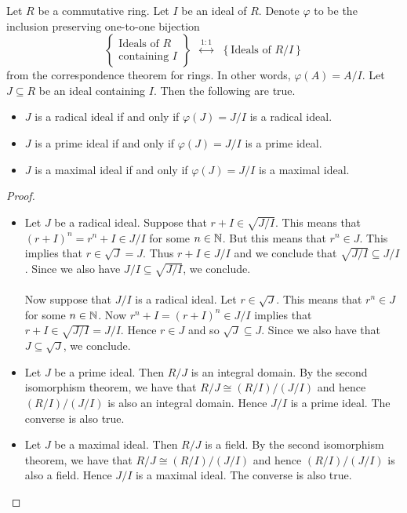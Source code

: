 \documentclass[a4paper]{article}
\begin{document}
\begin{thm}{}{} Let $R$ be a commutative ring. Let $I$ be an ideal of $R$. Denote $\varphi$ to be the inclusion preserving one-to-one bijection $$\left\{\substack{\text{Ideals of }R\\\text{containing }I}\right\}\;\;\overset{1:1}{\longleftrightarrow}\;\;\left\{\text{Ideals of }R/I\right\}$$ from the correspondence theorem for rings. In other words, $\varphi(A)=A/I$. Let $J\subseteq R$ be an ideal containing $I$. Then the following are true. 
\begin{itemize}
\item $J$ is a radical ideal if and only if $\varphi(J)=J/I$ is a radical ideal. 
\item $J$ is a prime ideal if and only if $\varphi(J)=J/I$ is a prime ideal. 
\item $J$ is a maximal ideal if and only if $\varphi(J)=J/I$ is a maximal ideal. 
\end{itemize} \tcbline
\begin{proof}~\\
\begin{itemize}
\item Let $J$ be a radical ideal. Suppose that $r+I\in\sqrt{J/I}$. This means that $(r+I)^n=r^n+I\in J/I$ for some $n\in\mathbb{N}$. But this means that $r^n\in J$. This implies that $r\in\sqrt{J}=J$. Thus $r+I\in J/I$ and we conclude that $\sqrt{J/I}\subseteq J/I$. Since we also have $J/I\subseteq\sqrt{J/I}$, we conclude. \\~\\

Now suppose that $J/I$ is a radical ideal. Let $r\in\sqrt{J}$. This means that $r^n\in J$ for some $n\in\mathbb{N}$. Now $r^n+I=(r+I)^n\in J/I$ implies that $r+I\in\sqrt{J/I}=J/I$. Hence $r\in J$ and so $\sqrt{J}\subseteq J$. Since we also have that $J\subseteq\sqrt{J}$, we conclude. 

\item Let $J$ be a prime ideal. Then $R/J$ is an integral domain. By the second isomorphism theorem, we have that $R/J\cong(R/I)/(J/I)$ and hence $(R/I)/(J/I)$ is also an integral domain. Hence $J/I$ is a prime ideal. The converse is also true. 

\item Let $J$ be a maximal ideal. Then $R/J$ is a field. By the second isomorphism theorem, we have that $R/J\cong(R/I)/(J/I)$ and hence $(R/I)/(J/I)$ is also a field. Hence $J/I$ is a maximal ideal. The converse is also true. 
\end{itemize}
\end{proof}
\end{thm}
\end{document}
